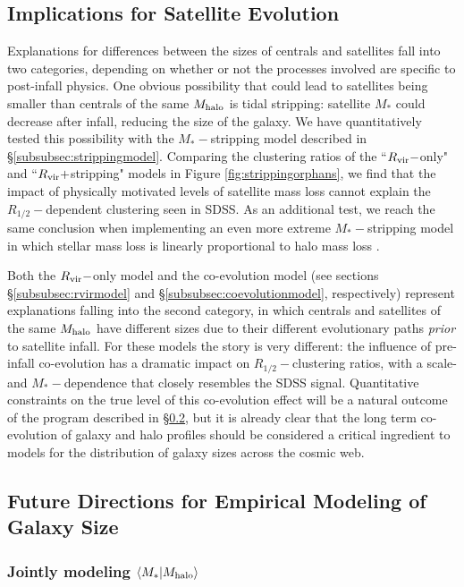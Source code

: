 \documentclass[usenatbib,usegraphicx,letterpaper]{mn2e}
\newcommand{\rhalf}{R_{1/2}}
\newcommand{\mstar}{M_{\ast}}
\newcommand{\mhalo}{M_{\rm halo}}
\newcommand{\rvir}{R_{\rm vir}}
\begin{document}
\subsection{Implications for Satellite Evolution}
\label{subsec:satellite_discussion}

Explanations for differences between the sizes of centrals and satellites fall into two categories, depending on whether or not the processes involved are specific to post-infall physics. One obvious possibility that could lead to satellites being smaller than centrals of the same $\mhalo$ is tidal stripping: satellite $\mstar$ could decrease after infall, reducing the size of the galaxy. We have quantitatively tested this possibility with the $\mstar-$stripping model described in \S\ref{subsubsec:strippingmodel}. Comparing the clustering ratios of the ``$\rvir-$only" and ``$\rvir+$stripping" models in Figure \ref{fig:strippingorphans}, we find that the impact of physically motivated levels of satellite mass loss cannot explain the $\rhalf-$dependent clustering seen in SDSS. As an additional test, we reach the same conclusion when implementing an even more extreme $\mstar-$stripping model in which stellar mass loss is linearly proportional to halo mass loss \citep[][Model 1]{watson_etal12}. 

Both the $\rvir-$only model and the co-evolution model (see sections \S\ref{subsubsec:rvirmodel} and \S\ref{subsubsec:coevolutionmodel}, respectively) represent explanations falling into the second category, in which centrals and satellites of the same $\mhalo$ have different sizes due to their different evolutionary paths {\em prior} to satellite infall. For these models the story is very different: the influence of pre-infall co-evolution has a dramatic impact on $\rhalf-$clustering ratios, with a scale- and $\mstar-$dependence that closely resembles the SDSS signal. Quantitative constraints on the true level of this co-evolution effect will be a natural outcome of the program described in \S\ref{subsec:future}, but it is already clear that the long term co-evolution of galaxy and halo profiles should be considered a critical ingredient to models for the distribution of galaxy sizes across the cosmic web. 

\subsection{Future Directions for Empirical Modeling of Galaxy Size}
\label{subsec:future}

\subsubsection{Jointly modeling $\langle\mstar\vert\mhalo\rangle$}
\end{document}
